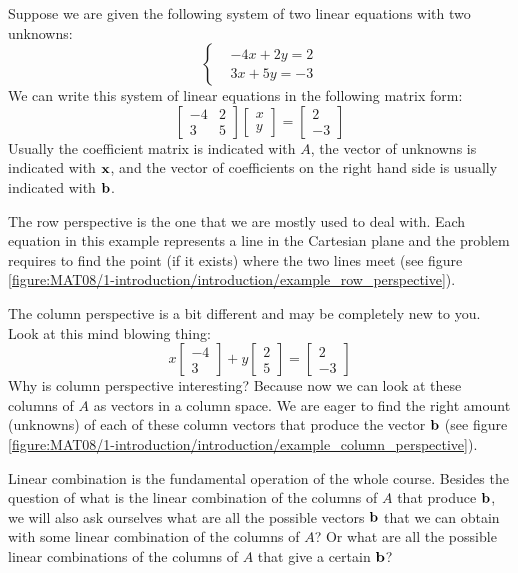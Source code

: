 \documentclass[computationalMathematics.tex]{subfiles}
\begin{document}
\begin{example}
    Suppose we are given the following system of two linear equations with two unknowns:
    \[
        \begin{cases}
            &-4x + 2y = 2 \\
            &3x + 5y = -3    
        \end{cases}
    \]
    We can write this system of linear equations in the following matrix form:
    \[
        \begin{bmatrix}
            -4 & 2 \\
            3 & 5
        \end{bmatrix}
        \begin{bmatrix}
            x \\
            y
        \end{bmatrix}
        =
        \begin{bmatrix}
            2 \\
            -3
        \end{bmatrix}
    \]
    Usually the coefficient matrix is indicated with $A$, the vector of unknowns is indicated with ${\bf x }$, and the vector of coefficients on the right hand side is usually indicated with ${\bf b }$.
    \par The row perspective is the one that we are mostly used to deal with. Each equation in this example represents a line in the Cartesian plane and the problem requires to find the point (if it exists) where the two lines meet (see figure \ref{figure:MAT08/1-introduction/introduction/example_row_perspective}).
    \par The column perspective is a bit different and may be completely new to you. Look at this mind blowing thing:
    \[
        x \begin{bmatrix} -4 \\ 3 \end{bmatrix} + y \begin{bmatrix} 2 \\ 5 \end{bmatrix} = \begin{bmatrix} 2 \\ -3 \end{bmatrix}
    \]
    Why is column perspective interesting? Because now we can look at these columns of $A$ as vectors in a column space. We are eager to find the right amount (unknowns) of each of these column vectors that produce the vector ${\bf b }$ (see figure \ref{figure:MAT08/1-introduction/introduction/example_column_perspective}).
    \par Linear combination is the fundamental operation of the whole course. Besides the question of what is the linear combination of the columns of $A$ that produce ${\bf b }$, we will also ask ourselves what are all the possible vectors ${\bf b }$ that we can obtain with some linear combination of the columns of $A$? Or what are all the possible linear combinations of the columns of $A$ that give a certain ${\bf b }$?
\end{example}
\end{document}
